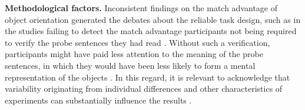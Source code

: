 \documentclass[
  man,floatsintext]{apa6}
\begin{document}
\textbf{Methodological factors.} Inconsistent findings on the match advantage of object orientation generated the debates about the reliable task design, such as in the studies failing to detect the match advantage participants not being required to verify the probe sentences they had read \autocite[see][]{zwaan_embodiment_2014}. Without such a verification, participants might have paid less attention to the meaning of the probe sentences, in which they would have been less likely to form a mental representation of the objects \autocite[e.g.,][]{zwaanReadersConstructSpatial1993}. In this regard, it is relevant to acknowledge that variability originating from individual differences and other characteristics of experiments can substantially influence the results \autocite{barsalouEstablishingGeneralizableMechanisms2019,kaschakEmbodimentLabTheory2021}.
\end{document}
